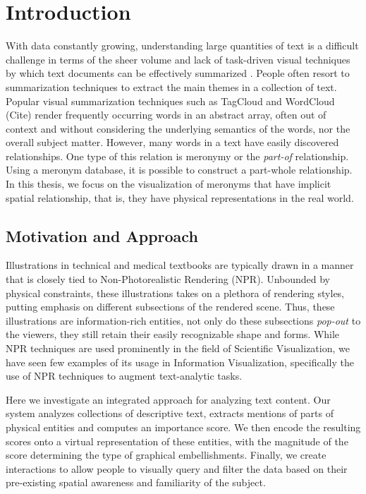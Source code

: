 \chapter{Introduction}
 With data constantly growing, understanding large quantities of text is a
 difficult challenge in terms of the sheer volume and lack of task-driven visual
 techniques by which text documents can be effectively summarized \cite{ROH2011a}.
 People often resort to summarization techniques to extract the main themes in a
 collection of text. Popular visual summarization techniques such as TagCloud
 and WordCloud (Cite) render frequently occurring words in an abstract array,
 often out of context and without considering the underlying semantics of the
 words, nor the overall subject matter. However, many words in a text have
 easily discovered relationships. One type of this relation is meronymy or the
 \emph{part-of} relationship. Using a meronym database, it is possible to
 construct a part-whole relationship. In this thesis, we focus on the
 visualization of meronyms that have implicit spatial relationship, that is,
 they have physical representations in the real world. 
 
 
 \section{Motivation and Approach}
 Illustrations in technical and medical textbooks are typically drawn in a
 manner that is closely tied to Non-Photorealistic Rendering (NPR). Unbounded by
 physical constraints, these illustrations takes on a plethora of rendering
 styles, putting emphasis on different subsections of the rendered scene. Thus,
 these illustrations are information-rich entities, not only do these
 subsections \emph{pop-out} to the viewers, they still retain their easily
 recognizable shape and forms. While NPR techniques are used prominently in the
 field of Scientific Visualization, we have seen few examples of its usage in
 Information Visualization, specifically the use of NPR techniques to augment
 text-analytic tasks.
 
 Here we investigate an integrated approach for analyzing text content. Our
 system analyzes collections of descriptive text, extracts mentions of parts of
 physical entities and computes an importance score. We then encode the
 resulting scores onto a virtual \threed representation of these entities,
 with the magnitude of the score determining the type of graphical
 embellishments. Finally, we create interactions to allow people to visually
 query and filter the data based on their pre-existing spatial awareness and
 familiarity of the subject.
 

